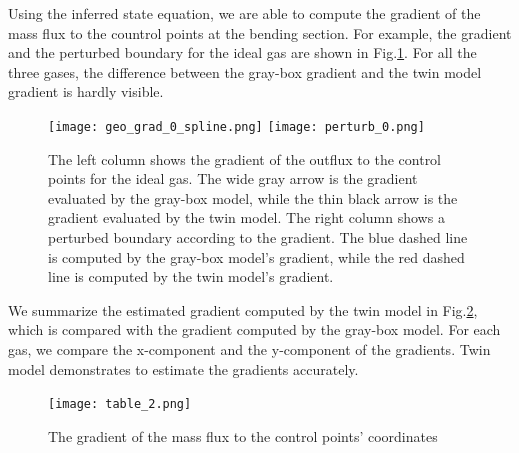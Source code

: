 \documentclass{paper1}
\begin{document}
\clearpage
Using the inferred state equation, we are able to compute the
gradient of the mass flux to the countrol points at the bending section.
For example, the gradient and the perturbed boundary for the ideal gas are shown in 
Fig.\ref{fig:NS perturb geo}.
For all the three gases, the difference between the gray-box gradient and the
twin model gradient is hardly visible.\\ 
\begin{figure}\begin{center}
    \texttt{[image: geo\_grad\_0\_spline.png]}
    \texttt{[image: perturb\_0.png]}
    \caption{\label{fig:NS perturb geo}
    The left column shows the gradient of the outflux to the control points for the 
    ideal gas. 
    The wide gray arrow is the gradient evaluated by the gray-box model, while
    the thin black arrow is the gradient evaluated by the twin model.
    The right column shows a perturbed boundary according to the gradient. 
    The blue dashed line is computed by the gray-box model's gradient, while the
    red dashed line is computed by the twin model's gradient.}
\end{center}\end{figure}

We summarize the estimated gradient computed by the twin model
in Fig.\ref{tab: idea gas gradient}, which is compared
with the gradient computed by the gray-box model. For each gas,
we compare the x-component and the y-component of the gradients.
Twin model demonstrates to estimate the gradients accurately.

\clearpage
\begin{figure}\centering
    \texttt{[image: table\_2.png]}
    \caption{The gradient of the mass flux to the control points' coordinates}
    \label{tab: idea gas gradient}
\end{figure}
\end{document}
